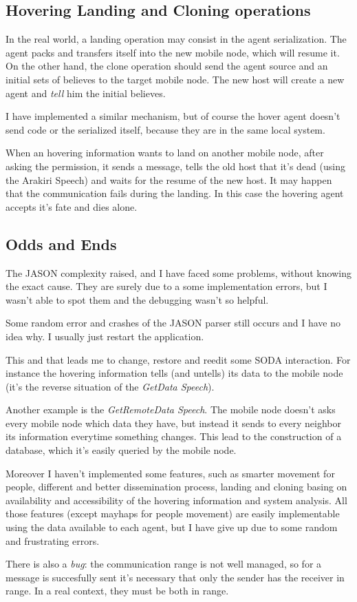 \subsection{Hovering Landing and Cloning operations}

In the real world, a landing operation may consist in the agent serialization.
The agent packs and transfers itself into the new mobile node, which will resume
it. On the other hand, the clone operation should send the agent source and an
initial sets of believes to the target mobile node. The new host will create a
new agent and \emph{tell} him the initial believes.

I have implemented a similar mechanism, but of course the hover agent doesn't
send code or the serialized itself, because they are in the same local system.

When an hovering information wants to land on another mobile node, after asking
the permission, it sends a message, tells the old host that it's dead (using
the Arakiri Speech) and waits for the resume of the new host. It may happen
that the communication fails during the landing. In this case the hovering
agent accepts it's fate and dies alone.

\subsection{Odds and Ends}

The JASON complexity raised, and I have faced some problems, without knowing
the exact cause. They are surely due to a some implementation errors, but I
wasn't able to spot them and the debugging wasn't so helpful. 

Some random error and crashes of the JASON parser still occurs and I have no
idea why. I usually just restart the application.

This and that leads me to change, restore and reedit some SODA interaction. For
instance the hovering information tells (and untells) its data to the mobile
node (it's the reverse situation of the \emph{GetData Speech}).

Another example is the \emph{GetRemoteData Speech}. The mobile node doesn't
asks every mobile node which data they have, but instead it sends to every
neighbor its information everytime something changes. This lead to the
construction of a database, which it's easily queried by the mobile node.

Moreover I haven't implemented some features, such as smarter movement for
people, different and better dissemination process, landing and cloning basing
on availability and accessibility of the hovering information and system
analysis. All those features (except mayhaps for people movement) are easily
implementable using the data available to each agent, but I have give up due to
some random and frustrating errors.

There is also a \emph{bug}: the communication range is not well managed, so for
a message is succesfully sent it's necessary that only the sender has the
receiver in range. In a real context, they must be both in range.
